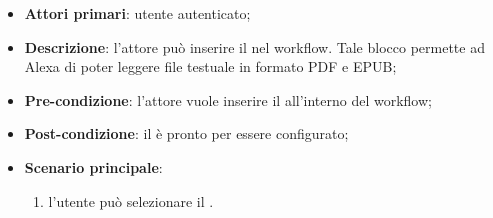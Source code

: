 \begin{itemize}
\item \textbf{Attori primari}: utente autenticato;

\item \textbf{Descrizione}:  l'attore può inserire il \BKindle{} nel workflow. Tale blocco permette ad Alexa di poter leggere file testuale in formato PDF e EPUB;

\item \textbf{Pre-condizione}: l'attore vuole inserire il \BKindle{} all'interno del workflow;

\item \textbf{Post-condizione}: il \BKindle{} è pronto per essere configurato;

\item \textbf{Scenario principale}:
\begin{enumerate}
\item  l'utente può selezionare il \BKindle{}.

\end{enumerate}
\end{itemize}

\pagebreak

